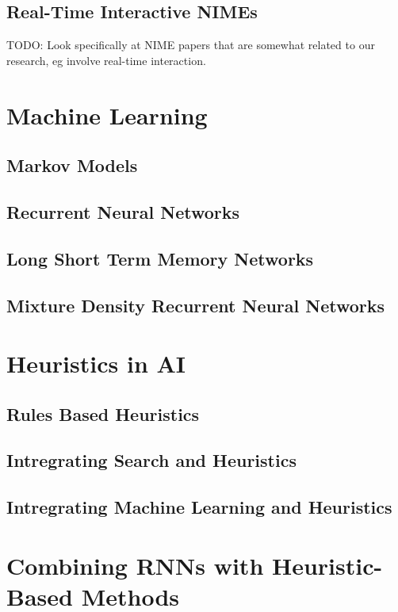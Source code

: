 \subsection{Real-Time Interactive NIMEs}
TODO: Look specifically at NIME papers that are somewhat related to our research, eg involve real-time interaction.


\section{Machine Learning}
\subsection{Markov Models}
\subsection{Recurrent Neural Networks}
\subsection{Long Short Term Memory Networks}
\subsection{Mixture Density Recurrent Neural Networks}

\section{Heuristics in AI}
\subsection{Rules Based Heuristics}
\subsection{Intregrating Search and Heuristics}
\subsection{Intregrating Machine Learning and Heuristics}

\section{Combining RNNs with Heuristic-Based Methods}
